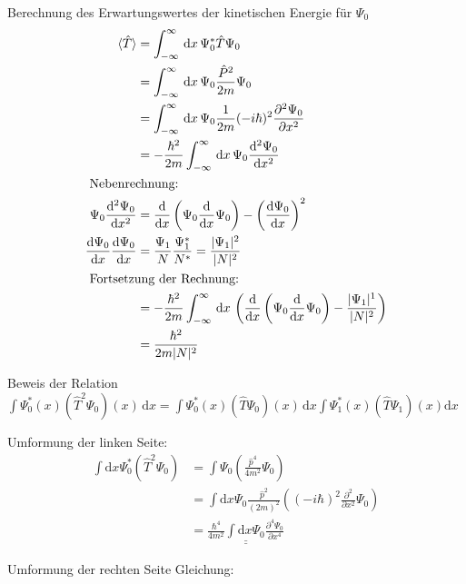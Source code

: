  Berechnung des Erwartungswertes der kinetischen Energie für $\Psi _0$
\begin{align}
\langle \hat T \rangle &= \int_{-\infty}^{\infty} \,\mathrm{d}x\, \Psi _0^* \hat T \Psi _0\\
&= \int_{-\infty}^{\infty} \,\mathrm{d}x\, \Psi _0 \frac{\hat P ^2}{2m} \Psi _0 \nonumber\\
&=\int_{-\infty}^{\infty} \,\mathrm{d}x\, \Psi _0\frac{1}{2m}(\--i\hbar)^2 \frac{\partial ^2 \Psi _0}{\partial x^2} \nonumber\\
&= \--\frac{\hbar ^2}{2m} \int_{-\infty}^{\infty} \,\mathrm{d}x\, \Psi _0 \frac{\mathrm{d}^2 \Psi _0}{\mathrm{d}x^2} \nonumber\\
\intertext{
    Nebenrechnung:
}
\Psi _0 \frac{\mathrm{d}^2 \Psi _0}{\mathrm{d}x^2}&= \frac{\mathrm{d}}{\mathrm{d}x}\left(\Psi _0 \frac{\mathrm{d}}{\mathrm{d}x} \Psi _0\right)
-\left(\frac{\mathrm{d}\Psi _0}{\mathrm{d}x}\right)^2\\
\frac{\mathrm{d}\Psi _0}{\mathrm{d}x} \frac{\mathrm{d}\Psi _0}{\mathrm{d}x} &= \frac{\Psi _1}{N} \frac{\Psi _1^*}{N^*}=\frac{\lvert\Psi _1\rvert^2}{\lvert N\rvert^2}\\
\intertext{
    Fortsetzung der Rechnung:
}
&=\-- \frac{\hbar ^2}{2m}\int_{-\infty}^{\infty} \,\mathrm{d}x\, \left(\frac{\mathrm{d}}{\mathrm{d}x}\left(\Psi _0 \frac{\mathrm{d}}{\mathrm{d}x} \Psi _0\right)-\frac{\lvert\Psi _1\rvert^1}{\lvert N\rvert^2} \right) \nonumber\\
&=\frac{\hbar ^2}{2m \lvert N\rvert^2}
\end{align}

Beweis der Relation $\int \Psi _0^*(x)(\hat T ^2 \Psi _0)(x)\,\mathrm{d}x = \int \Psi_0^*(x) (\hat T \Psi _0 )(x) \,\mathrm{d}x \int \Psi _1^* (x)(\hat T \Psi _1)(x)\mathrm{d}x $

Umformung der linken Seite:
\begin{align}
    \int \mathrm{d}x \Psi _0^* (\hat T ^2 \Psi _0 ) &= \int \Psi _0 \left(\frac{\hat p ^4}{4m^2}\Psi _0 \right)\\
    &=\int \mathrm{d}x \Psi _0 \frac{\hat p ^2}{(2m)^2} \left((-i \hbar)^2 \frac{\partial ^2}{\partial x^2} \Psi _0 \right) \nonumber\\   
    &=\underline{\underline{\frac{\hbar ^4}{4m^2}\int \mathrm{d}x \Psi _0 \frac{\partial ^4 \Psi _0}{\partial x^4}}}
\end{align}

Umformung der rechten Seite Gleichung:

